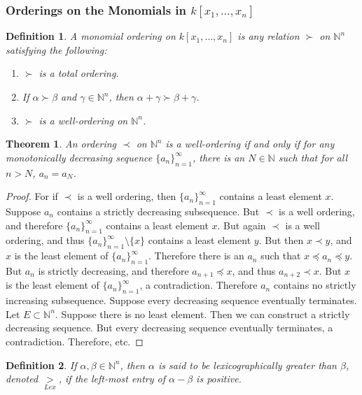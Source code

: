 \documentclass[oneside]{book}
\theoremstyle{mystyle}
\newtheorem{theorem}{Theorem}[section]
\newtheorem{definition}{Definition}[section]
\begin{document}
\subsubsection{Orderings on the Monomials in \texorpdfstring{$k[x_1,\hdots ,x_n]$}{kx}}
\begin{definition}
A monomial ordering on $k[x_1,\hdots, x_n]$ is any relation $\succ$ on $\mathbb{N}^n$ satisfying the following:
\begin{enumerate}
    \item $\succ$ is a total ordering.
    \item If $\alpha \succ \beta$ and $\gamma \in \mathbb{N}^n$, then $\alpha+\gamma \succ \beta + \gamma$.
    \item $\succ$ is a well-ordering on $\mathbb{N}^n$. 
\end{enumerate}
\end{definition}
\begin{theorem}
An ordering $\prec$ on $\mathbb{N}^n$ is a well-ordering if and only if for any monotonically decreasing sequence $\{a_n\}_{n=1}^{\infty}$, there is an $N\in \mathbb{N}$ such that for all $n>N$, $a_n = a_N$.
\end{theorem}
\begin{proof}
For if $\prec$ is a well ordering, then $\{a_n\}_{n=1}^{\infty}$ contains a least element $x$. Suppose $a_n$ contains a strictly decreasing subsequence. But $\prec$ is a well ordering, and therefore $\{a_n\}_{n=1}^{\infty}$ contains a least element $x$. But again $\prec$ is a well ordering, and thus $\{a_n\}_{n=1}^{\infty} \setminus \{x\}$ contains a least element $y$. But then $x\prec y$, and $x$ is the least element of $\{a_n\}_{n=1}^{\infty}$. Therefore there is an $a_n$ such that $x\preceq a_n \preceq y$. But $a_n$ is strictly decreasing, and therefore $a_{n+1} \preceq x$, and thus $a_{n+2} \prec x$. But $x$ is the least element of $\{a_n\}_{n=1}^{\infty}$, a contradiction. Therefore $a_n$ contains no strictly increasing subsequence. Suppose every decreasing sequence eventually terminates. Let $E\subset \mathbb{N}^n$. Suppose there is no least element. Then we can construct a strictly decreasing sequence. But every decreasing sequence eventually terminates, a contradiction. Therefore, etc.
\end{proof}
\begin{definition}
If $\alpha,\beta \in \mathbb{N}^n$, then $\alpha$ is said to be lexicographically greater than $\beta$, denoted $\underset{Lex}{>}$, if the left-most entry of $\alpha-\beta$ is positive.
\end{definition}
\end{document}
